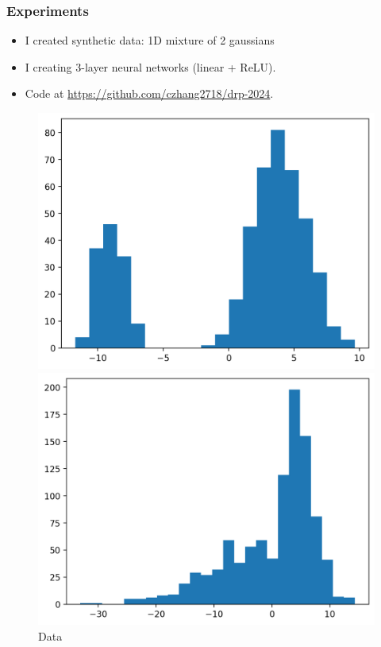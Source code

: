 \documentclass{beamer}
\begin{document}
\begin{frame}
    \frametitle{Experiments}
    \begin{itemize}
        \item I created synthetic data: 1D mixture of 2 gaussians
        \item I creating 3-layer neural networks (linear + ReLU).
        \item Code at \url{https://github.com/czhang2718/drp-2024}.
    \end{itemize}
    \begin{figure}
        \centering
        \begin{minipage}{0.22\textwidth}
            \centering
            \includegraphics[width=1\textwidth]{images/mix_gauss.png}
            \caption[]{Data}
        \end{minipage}\hfill
        \begin{minipage}{0.22\textwidth}
            \centering
            \includegraphics[width=1\textwidth]{images/vae_plot}

\end{minipage}
\end{figure}
\end{frame}
\end{document}

